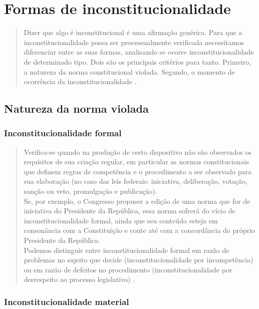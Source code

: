 \documentclass{article}
\begin{document}
\section{Formas de inconstitucionalidade}

\begin{quote}
    Dizer que algo é inconstitucional é uma afirmação genérica. Para que a inconstitucionalidade possa ser processualmente verificada necessitamos diferenciar entre as suas formas, analisando se ocorre inconstitucionalidade de determinado tipo. Dois são os principais critérios para tanto. Primeiro, a natureza da norma constitucional violada. Segundo, o momento de ocorrência da inconstitucionalidade \cite[p. 96]{dimoulis_curso_2016}.
\end{quote}

\subsection{Natureza da norma violada}

\subsubsection{Inconstitucionalidade formal}

\begin{quote}
    Verifica-se quando na produção de certo dispositivo não são observados os requisitos de sua criação regular, em particular as normas constitucionais que definem regras de competência e o procedimento a ser observado para sua elaboração (no caso das leis federais: iniciativa, deliberação, votação, sanção ou veto, promulgação e publicação).\\
    Se, por exemplo, o Congresso propuser a edição de uma norma que for de iniciativa do Presidente da República, essa norma sofrerá do vício de inconstitucionalidade formal, ainda que seu conteúdo esteja em consonância com a Constituição e conte até com a concordância do próprio Presidente da República.\\
    Podemos distinguir entre inconstitucionalidade formal em razão de problemas no sujeito que decide (inconstitucionalidade por incompetência) ou em razão de defeitos no procedimento (inconstitucionalidade por desrespeito ao processo legislativo) \cite[p. 96]{dimoulis_curso_2016}.
\end{quote}

\subsubsection{Inconstitucionalidade material}
\end{document}
